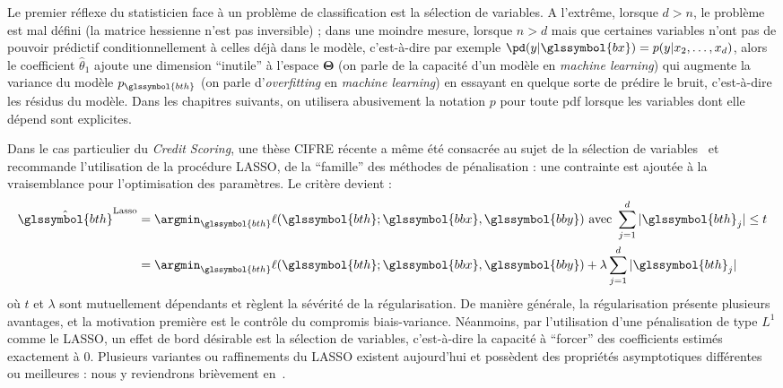 Le premier réflexe du statisticien face à un problème de classification est la sélection de variables. A l'extrême, lorsque $d > n$, le problème est mal défini (la matrice hessienne n'est pas inversible) ; dans une moindre mesure, lorsque $n > d$ mais que certaines variables n'ont pas de pouvoir prédictif conditionnellement à celles déjà dans le modèle, c'est-à-dire par exemple $\pd(y | \glssymbol{bx}) = p(y|x_2,\dots,x_d)$, alors le coefficient $\hat{\theta}_1$ ajoute une dimension ``inutile'' à l'espace $\bm{\Theta}$ (on parle de la capacité d'un modèle en \textit{machine learning}) qui augmente la variance du modèle $p_{\glssymbol{bth}}$ (on parle d'\textit{overfitting} en \textit{machine learning}) en essayant en quelque sorte de prédire le bruit, c'est-à-dire les résidus du modèle. Dans les chapitres suivants, on utilisera abusivement la notation $p$ pour toute \gls{pdf} lorsque les variables dont elle dépend sont explicites.



Dans le cas particulier du \textit{Credit Scoring}, une thèse CIFRE récente a même été consacrée au sujet de la sélection de variables~\cite{vital2016} et recommande l'utilisation de la procédure LASSO, de la ``famille'' des méthodes de pénalisation : une contrainte est ajoutée à la vraisemblance pour l'optimisation des paramètres. Le critère devient :
\begin{align*}
\hat{\glssymbol{bth}}^{\text{Lasso}} & = \argmin_{\glssymbol{bth}} \ell(\glssymbol{bth};\glssymbol{bbx},\glssymbol{bby}) \text{ avec } \sum_{j=1}^d |\glssymbol{bth}_j| \leq t \\
 & = \argmin_{\glssymbol{bth}}  \ell(\glssymbol{bth};\glssymbol{bbx},\glssymbol{bby}) + \lambda \sum_{j=1}^d |\glssymbol{bth}_j|
\end{align*}
où $t$ et $\lambda$ sont mutuellement dépendants et règlent la sévérité de la régularisation. De manière générale, la régularisation présente plusieurs avantages, et la motivation première est le contrôle du compromis biais-variance. Néanmoins, par l'utilisation d'une pénalisation de type $L^1$ comme le LASSO, un effet de bord désirable est la sélection de variables, c'est-à-dire la capacité à ``forcer'' des coefficients estimés exactement à $0$. Plusieurs variantes ou raffinements du LASSO existent aujourd'hui et possèdent des propriétés asymptotiques différentes ou meilleures : nous y reviendrons brièvement en~.


